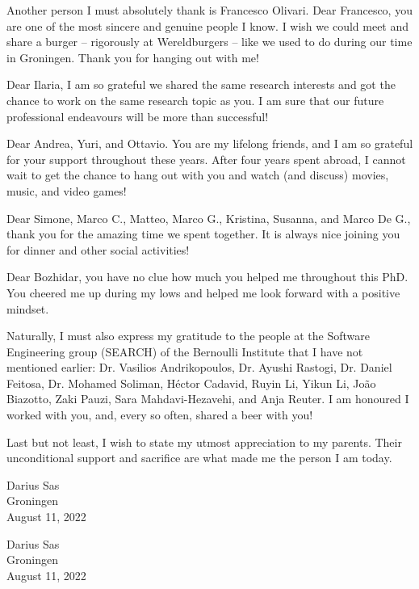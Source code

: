 Another person I must absolutely thank is Francesco Olivari. Dear Francesco, you are one of the most sincere and genuine people I know.  
I wish we could meet and share a burger -- rigorously at Wereldburgers -- like we used to do during our time in Groningen.
Thank you for hanging out with me! 

Dear Ilaria, I am so grateful we shared the same research interests and got the chance to work on the same research topic as you. I am sure that our future professional endeavours will be more than successful!

Dear Andrea, Yuri, and Ottavio. You are my lifelong friends, and I am so grateful for your support throughout these years. 
After four years spent abroad, I cannot wait to get the chance to hang out with you and watch (and discuss) movies, music, and video games!

Dear Simone, Marco C., Matteo, Marco G., Kristina, Susanna, and Marco De G., thank you for the amazing time we spent together. It is always nice joining you for dinner and other social activities!

Dear Bozhidar, you have no clue how much you helped me throughout this PhD. You cheered me up during my lows and helped me look forward with a positive mindset.

Naturally, I must also express my gratitude to the people at the Software Engineering group (SEARCH) of the Bernoulli Institute that I have not mentioned earlier: Dr. Vasilios Andrikopoulos,  Dr. Ayushi Rastogi, Dr. Daniel Feitosa,  Dr. Mohamed Soliman, H\'ector Cadavid, Ruyin Li, Yikun Li, João Biazotto, Zaki Pauzi, Sara Mahdavi-Hezavehi, and Anja Reuter. 
I am honoured I worked with you, and, every so often, shared a beer with you!

Last but not least, I wish to state my utmost appreciation to my parents.
Their unconditional support and sacrifice are what made me the person I am today.


\begin{flushright}
    Darius Sas\\
    Groningen\\
    August 11, 2022
\end{flushright}


\begin{flushright}
    Darius Sas\\
    Groningen\\
    August 11, 2022
\end{flushright}